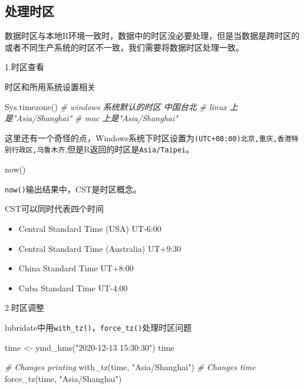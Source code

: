 \documentclass[
]{book}
\newenvironment{Shaded}{\begin{snugshade}}{\end{snugshade}}
\newcommand{\CommentTok}[1]{\textcolor[rgb]{0.56,0.35,0.01}{\textit{#1}}}
\newcommand{\FunctionTok}[1]{\textcolor[rgb]{0.00,0.00,0.00}{#1}}
\newcommand{\NormalTok}[1]{#1}
\newcommand{\OtherTok}[1]{\textcolor[rgb]{0.56,0.35,0.01}{#1}}
\newcommand{\StringTok}[1]{\textcolor[rgb]{0.31,0.60,0.02}{#1}}
\providecommand{\tightlist}{%
  \setlength{\itemsep}{0pt}\setlength{\parskip}{0pt}}
\begin{document}
\hypertarget{lubridate:time-zones}{%
\subsection{处理时区}\label{lubridate:time-zones}}

数据时区与本地R环境一致时，数据中的时区没必要处理，但是当数据是跨时区的或者不同生产系统的时区不一致，我们需要将数据时区处理一致。

1.时区查看

时区和所用系统设置相关

\begin{Shaded}
\begin{Highlighting}[]
\FunctionTok{Sys.timezone}\NormalTok{()}
\CommentTok{\# windows 系统默认的时区 中国台北}
\CommentTok{\# linux 上是"Asia/Shanghai"}
\CommentTok{\# mac 上是"Asia/Shanghai"}
\end{Highlighting}
\end{Shaded}

这里还有一个奇怪的点，Windows系统下时区设置为\texttt{(UTC+08:00)北京,重庆,香港特别行政区,乌鲁木齐},但是R返回的时区是\texttt{Asia/Taipei}。

\begin{Shaded}
\begin{Highlighting}[]
\FunctionTok{now}\NormalTok{()}
\end{Highlighting}
\end{Shaded}

\texttt{now()}输出结果中，CST是时区概念。

CST可以同时代表四个时间

\begin{itemize}
\tightlist
\item
  Central Standard Time (USA) UT-6:00
\item
  Central Standard Time (Australia) UT+9:30
\item
  China Standard Time UT+8:00
\item
  Cuba Standard Time UT-4:00
\end{itemize}

2.时区调整

lubridate中用\texttt{with\_tz()}，\texttt{force\_tz()}处理时区问题

\begin{Shaded}
\begin{Highlighting}[]
\NormalTok{time }\OtherTok{\textless{}{-}} \FunctionTok{ymd\_hms}\NormalTok{(}\StringTok{"2020{-}12{-}13 15:30:30"}\NormalTok{)}
\NormalTok{time}

\CommentTok{\# Changes printing}
\FunctionTok{with\_tz}\NormalTok{(time, }\StringTok{"Asia/Shanghai"}\NormalTok{)}
\CommentTok{\# Changes time}
\FunctionTok{force\_tz}\NormalTok{(time, }\StringTok{"Asia/Shanghai"}\NormalTok{)}
\end{Highlighting}
\end{Shaded}
\end{document}
